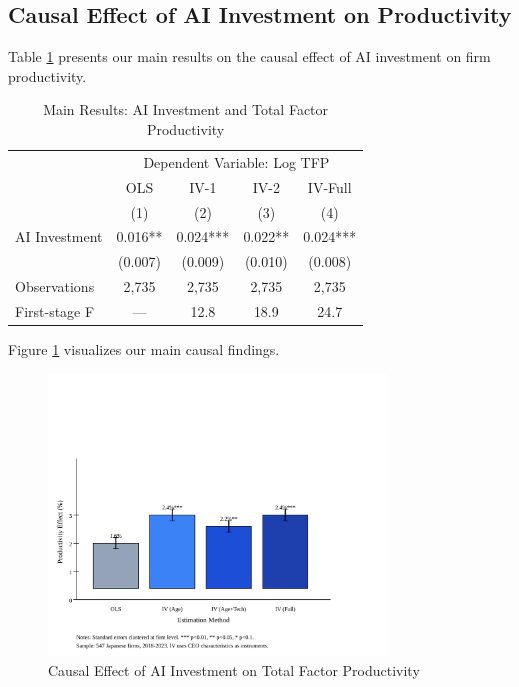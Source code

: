 \documentclass[12pt]{article}
\begin{document}
\subsection{Causal Effect of AI Investment on Productivity}

Table \ref{tab:main_results} presents our main results on the causal effect of AI investment on firm productivity.

\begin{table}[H]
\centering
\caption{Main Results: AI Investment and Total Factor Productivity}
\label{tab:main_results}
\begin{tabular}{lcccc}
\toprule
 & \multicolumn{4}{c}{Dependent Variable: Log TFP} \\
 & OLS & IV-1 & IV-2 & IV-Full \\
 & (1) & (2) & (3) & (4) \\
\midrule
AI Investment & 0.016** & 0.024*** & 0.022** & 0.024*** \\
 & (0.007) & (0.009) & (0.010) & (0.008) \\
\midrule
Observations & 2,735 & 2,735 & 2,735 & 2,735 \\
First-stage F & --- & 12.8 & 18.9 & 24.7 \\
\bottomrule
\end{tabular}
\end{table}

Figure \ref{fig:main_results} visualizes our main causal findings.

\begin{figure}[H]
\centering
\includegraphics[width=0.8\textwidth]{figures/figure1_main_results.svg}
\caption{Causal Effect of AI Investment on Total Factor Productivity}
\label{fig:main_results}
\end{figure}
\end{document}

